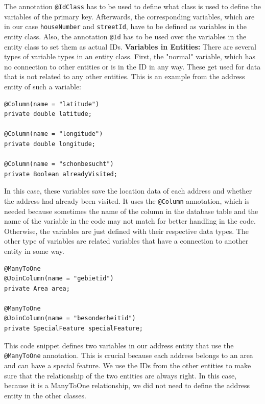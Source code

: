     The annotation \texttt{@IdClass} has to be used to define what class is used to define the variables of the primary key. Afterwards, the corresponding variables, which are in our case \texttt{houseNumber} and \texttt{streetId}, have to be defined as variables in the entity class. Also, the annotation \texttt{@Id} has to be used over the variables in the entity class to set them as actual IDs. \newline 
    \textbf{Variables in Entities:} \newline
    There are several types of variable types in an entity class. First, the "normal" variable, which has no connection to other entities or is in the ID in any way. These get used for data that is not related to any other entities. This is an example from the address entity of such a variable:
    \begin{verbatim}
@Column(name = "latitude")
private double latitude;
    
@Column(name = "longitude")
private double longitude;
    
@Column(name = "schonbesucht")
private Boolean alreadyVisited;                     
    \end{verbatim} 

    In this case, these variables save the location data of each address and whether the address had already been visited. It uses the \texttt{@Column} annotation, which is needed because sometimes the name of the column in the database table and the name of the variable in the code may not match for better handling in the code. Otherwise, the variables are just defined with their respective data types. \newline
    The other type of variables are related variables that have a connection to another entity in some way.
    \begin{verbatim}
@ManyToOne
@JoinColumn(name = "gebietid")
private Area area;
    
@ManyToOne
@JoinColumn(name = "besonderheitid")
private SpecialFeature specialFeature;                    
    \end{verbatim} 

    This code snippet defines two variables in our address entity that use the \texttt{@ManyToOne} annotation. This is crucial because each address belongs to an area and can have a special feature. We use the IDs from the other entities to make sure that the relationship of the two entities are always right. In this case, because it is a ManyToOne relationship, we did not need to define the address entity in the other classes. \newline

